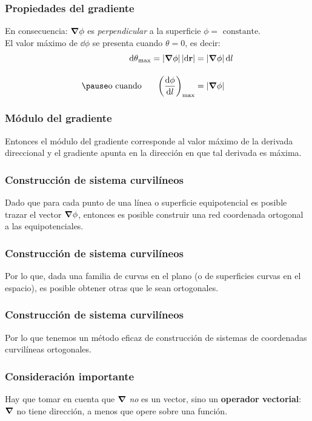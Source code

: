 \documentclass[12pt]{beamer}
\begin{document}
\begin{frame}
\frametitle{Propiedades del gradiente}
En consecuencia: $\grad{\phi}$ es \emph{perpendicular} a la superficie $\phi = \mbox{ constante}$.
\\
\bigskip
\pause
El valor máximo de $\dd{\phi}$ se presenta cuando $\theta = 0$, es decir:
\pause
\begin{align*}
\begin{aligned}
\dd{\theta}_{\max} = \abs{\grad{\phi}} \, \abs{\dd{\vb{r}}} &= \abs{\grad{\phi}} \dd{l} \\[1em] \pause
\mbox{o cuando } \hspace{0.5cm} \left( \dv{\phi}{l} \right)_{\max} &= \abs{\grad{\phi}}
\end{aligned}
\end{align*}
\end{frame}
\begin{frame}
\frametitle{Módulo del gradiente}
Entonces el módulo del gradiente corresponde al valor máximo de la derivada direccional y el gradiente apunta en la dirección en que tal derivada es máxima.
\end{frame}
\begin{frame}
\frametitle{Construcción de sistema curvilíneos}
Dado que para cada punto de una línea o superficie equipotencial es posible trazar el vector $\grad{\phi}$, entonces es posible construir una red coordenada ortogonal a las equipotenciales.
\end{frame}
\begin{frame}
\frametitle{Construcción de sistema curvilíneos}
Por lo que, dada una familia de curvas en el plano (o de superficies curvas en el espacio), es posible obtener otras que le sean ortogonales.
\end{frame}
\begin{frame}
\frametitle{Construcción de sistema curvilíneos}
Por lo que tenemos un método eficaz de construcción de sistemas de coordenadas curvilíneas ortogonales.
\end{frame}
\begin{frame}
\frametitle{Consideración importante}
Hay que tomar en cuenta que $\grad$ \emph{no} es un vector, sino un \textbf{operador vectorial}: $\grad$ no tiene dirección, a menos que opere sobre una función.
\end{frame}
\end{document}
